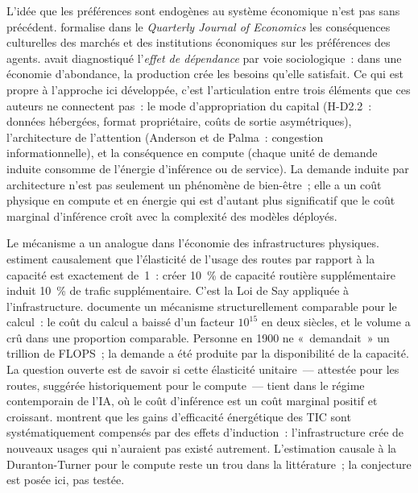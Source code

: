 L'idée que les préférences sont endogènes au système économique n'est pas sans précédent. \textcite{bowles_endogenous_1998} formalise dans le \emph{Quarterly Journal of Economics} les conséquences culturelles des marchés et des institutions économiques sur les préférences des agents. \textcite{galbraith_affluent_1958} avait diagnostiqué l'\emph{effet de dépendance} par voie sociologique~: dans une économie d'abondance, la production crée les besoins qu'elle satisfait. Ce qui est propre à l'approche ici développée, c'est l'articulation entre trois éléments que ces auteurs ne connectent pas~: le mode d'appropriation du capital (H-D2.2~: données hébergées, format propriétaire, coûts de sortie asymétriques), l'architecture de l'attention (Anderson et de Palma~: congestion informationnelle), et la conséquence en compute (chaque unité de demande induite consomme de l'énergie d'inférence ou de service). La demande induite par architecture n'est pas seulement un phénomène de bien-être~; elle a un coût physique en compute et en énergie qui est d'autant plus significatif que le coût marginal d'inférence croît avec la complexité des modèles déployés.

Le mécanisme a un analogue dans l'économie des infrastructures physiques. \textcite{duranton_fundamental_2011} estiment causalement que l'élasticité de l'usage des routes par rapport à la capacité est exactement de~1~: créer 10~\% de capacité routière supplémentaire induit 10~\% de trafic supplémentaire. C'est la Loi de Say appliquée à l'infrastructure. \textcite{nordhaus_two_2007} documente un mécanisme structurellement comparable pour le calcul~: le coût du calcul a baissé d'un facteur $10^{15}$ en deux siècles, et le volume a crû dans une proportion comparable. Personne en 1900 ne «~demandait~» un trillion de FLOPS~; la demande a été produite par la disponibilité de la capacité. La question ouverte est de savoir si cette élasticité unitaire~--- attestée pour les routes, suggérée historiquement pour le compute~--- tient dans le régime contemporain de l'IA, où le coût d'inférence est un coût marginal positif et croissant. \textcite{coroama_digital_2019} montrent que les gains d'efficacité énergétique des TIC sont systématiquement compensés par des effets d'induction~: l'infrastructure crée de nouveaux usages qui n'auraient pas existé autrement. L'estimation causale à la Duranton-Turner pour le compute reste un trou dans la littérature~; la conjecture est posée ici, pas testée.

